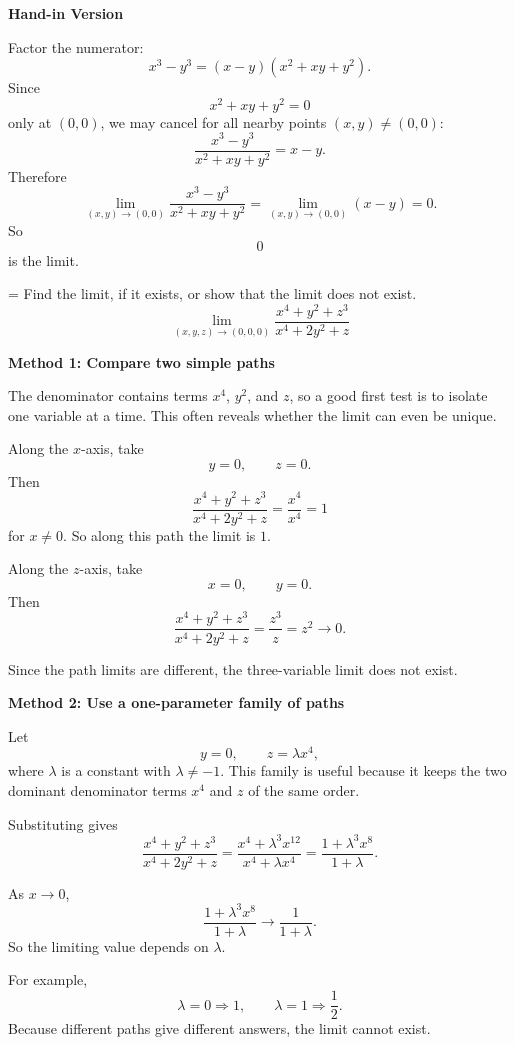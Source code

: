 \documentclass[a4paper,12pt,twocolumn]{article}
\newlength{\problemnumberwidth}
\newenvironment{solutionbox}{\begin{framed}}{\end{framed}}
\newcommand{\problem}[3]{%
  \Needspace{10\baselineskip}%
  \phantomsection\label{#1}%
  \par\vspace{0.8em}%
  \noindent
  \hangindent=\problemnumberwidth
  \hangafter=1
  \makebox[\problemnumberwidth][l]{\textbf{#2.}}#3\par
}
\begin{document}
\begin{solutionbox}
\textbf{Hand-in Version}

Factor the numerator:
\[
x^3-y^3=(x-y)(x^2+xy+y^2).
\]
Since
\[
x^2+xy+y^2=0
\]
only at \((0,0)\), we may cancel for all nearby points \((x,y)\ne(0,0)\):
\[
\frac{x^3-y^3}{x^2+xy+y^2}=x-y.
\]
Therefore
\[
\lim_{(x,y)\to(0,0)} \frac{x^3-y^3}{x^2+xy+y^2}
=
\lim_{(x,y)\to(0,0)}(x-y)=0.
\]
So
\[
\boxed{0}
\]
is the limit.
\end{solutionbox}

\problem{prob:14-2-30}{30}{Find the limit, if it exists, or show that the limit does not exist.
\[
\lim_{(x,y,z)\to(0,0,0)} \frac{x^4+y^2+z^3}{x^4+2y^2+z}
\]}

\begin{solutionbox}
\textbf{Method 1: Compare two simple paths}

\begin{steps}
\item The denominator contains terms \(x^4\), \(y^2\), and \(z\), so a good first test is to isolate one variable at a time. This often reveals whether the limit can even be unique.

\item Along the \(x\)-axis, take
\[
y=0,\qquad z=0.
\]
Then
\[
\frac{x^4+y^2+z^3}{x^4+2y^2+z}
=\frac{x^4}{x^4}=1
\]
for \(x\ne 0\). So along this path the limit is \(1\).

\item Along the \(z\)-axis, take
\[
x=0,\qquad y=0.
\]
Then
\[
\frac{x^4+y^2+z^3}{x^4+2y^2+z}
=\frac{z^3}{z}=z^2\to 0.
\]

\item Since the path limits are different, the three-variable limit does not exist.
\end{steps}
\end{solutionbox}

\begin{solutionbox}
\textbf{Method 2: Use a one-parameter family of paths}

\begin{steps}
\item Let
\[
y=0,\qquad z=\lambda x^4,
\]
where \(\lambda\) is a constant with \(\lambda\ne -1\). This family is useful because it keeps the two dominant denominator terms \(x^4\) and \(z\) of the same order.

\item Substituting gives
\[
\frac{x^4+y^2+z^3}{x^4+2y^2+z}
=
\frac{x^4+\lambda^3x^{12}}{x^4+\lambda x^4}
=
\frac{1+\lambda^3x^8}{1+\lambda}.
\]

\item As \(x\to 0\),
\[
\frac{1+\lambda^3x^8}{1+\lambda}\to \frac{1}{1+\lambda}.
\]
So the limiting value depends on \(\lambda\).

\item For example,
\[
\lambda=0 \Rightarrow 1,
\qquad
\lambda=1 \Rightarrow \frac12.
\]
Because different paths give different answers, the limit cannot exist.
\end{steps}
\end{solutionbox}
\end{document}
